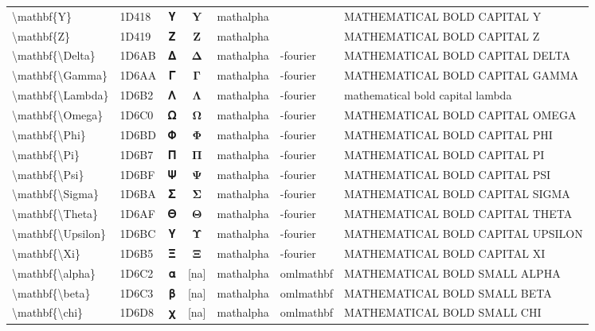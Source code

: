 \documentclass[a4paper,landscape]{article}
\begin{document}
\begin{longtable}{llcclll}
\textbackslash{}mathbf\{Y\} & 1D418 & 𝐘 & $\mathbf{Y}$ & mathalpha &  & MATHEMATICAL BOLD CAPITAL Y \\
\textbackslash{}mathbf\{Z\} & 1D419 & 𝐙 & $\mathbf{Z}$ & mathalpha &  & MATHEMATICAL BOLD CAPITAL Z \\
\textbackslash{}mathbf\{\textbackslash{}Delta\} & 1D6AB & 𝚫 & $\mathbf{\Delta}$ & mathalpha & -fourier & MATHEMATICAL BOLD CAPITAL DELTA \\
\textbackslash{}mathbf\{\textbackslash{}Gamma\} & 1D6AA & 𝚪 & $\mathbf{\Gamma}$ & mathalpha & -fourier & MATHEMATICAL BOLD CAPITAL GAMMA \\
\textbackslash{}mathbf\{\textbackslash{}Lambda\} & 1D6B2 & 𝚲 & $\mathbf{\Lambda}$ & mathalpha & -fourier & mathematical bold capital lambda \\
\textbackslash{}mathbf\{\textbackslash{}Omega\} & 1D6C0 & 𝛀 & $\mathbf{\Omega}$ & mathalpha & -fourier & MATHEMATICAL BOLD CAPITAL OMEGA \\
\textbackslash{}mathbf\{\textbackslash{}Phi\} & 1D6BD & 𝚽 & $\mathbf{\Phi}$ & mathalpha & -fourier & MATHEMATICAL BOLD CAPITAL PHI \\
\textbackslash{}mathbf\{\textbackslash{}Pi\} & 1D6B7 & 𝚷 & $\mathbf{\Pi}$ & mathalpha & -fourier & MATHEMATICAL BOLD CAPITAL PI \\
\textbackslash{}mathbf\{\textbackslash{}Psi\} & 1D6BF & 𝚿 & $\mathbf{\Psi}$ & mathalpha & -fourier & MATHEMATICAL BOLD CAPITAL PSI \\
\textbackslash{}mathbf\{\textbackslash{}Sigma\} & 1D6BA & 𝚺 & $\mathbf{\Sigma}$ & mathalpha & -fourier & MATHEMATICAL BOLD CAPITAL SIGMA \\
\textbackslash{}mathbf\{\textbackslash{}Theta\} & 1D6AF & 𝚯 & $\mathbf{\Theta}$ & mathalpha & -fourier & MATHEMATICAL BOLD CAPITAL THETA \\
\textbackslash{}mathbf\{\textbackslash{}Upsilon\} & 1D6BC & 𝚼 & $\mathbf{\Upsilon}$ & mathalpha & -fourier & MATHEMATICAL BOLD CAPITAL UPSILON \\
\textbackslash{}mathbf\{\textbackslash{}Xi\} & 1D6B5 & 𝚵 & $\mathbf{\Xi}$ & mathalpha & -fourier & MATHEMATICAL BOLD CAPITAL XI \\
\textbackslash{}mathbf\{\textbackslash{}alpha\} & 1D6C2 & 𝛂 & [na] & mathalpha & omlmathbf & MATHEMATICAL BOLD SMALL ALPHA \\
\textbackslash{}mathbf\{\textbackslash{}beta\} & 1D6C3 & 𝛃 & [na] & mathalpha & omlmathbf & MATHEMATICAL BOLD SMALL BETA \\
\textbackslash{}mathbf\{\textbackslash{}chi\} & 1D6D8 & 𝛘 & [na] & mathalpha & omlmathbf & MATHEMATICAL BOLD SMALL CHI \\

\end{longtable}
\end{document}

